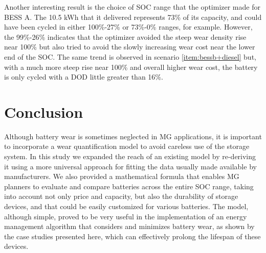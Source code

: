 \documentclass{ieeeaccess}
\begin{document}
    Another interesting result is the choice of \ac{SOC} range that the optimizer made for \ac{BESS} A. The 10.5 kWh that it delivered represents 73\% of its capacity, and could have been cycled in either 100\%-27\% or 73\%-0\% ranges, for example. However, the 99\%-26\% indicates that the optimizer avoided the steep wear density rise near 100\% but also tried to avoid the slowly increasing wear cost near the lower end of the \ac{SOC}. The same trend is observed in scenario \ref{item:bessb+diesel} but, with a much more steep rise near 100\% and overall higher wear cost, the battery is only cycled with a \ac{DOD} little greater than 16\%.

    \section{Conclusion}
    Although battery wear is sometimes neglected in \ac{MG} applications, it is important to incorporate a wear quantification model to avoid careless use of the storage system. In this study we expanded the reach of an existing model by re-deriving it using a more universal approach for fitting the data usually made available by manufacturers. We also provided a mathematical formula that enables \ac{MG} planners to evaluate and compare batteries across the entire \ac{SOC} range, taking into account not only price and capacity, but also the durability of storage devices, and that could be easily customized for various batteries. The model, although simple, proved to be very useful in the implementation of an energy management algorithm that considers and minimizes battery wear, as shown by the case studies presented here, which can effectively prolong the lifespan of these devices.

    
    

\EOD
\end{document}
